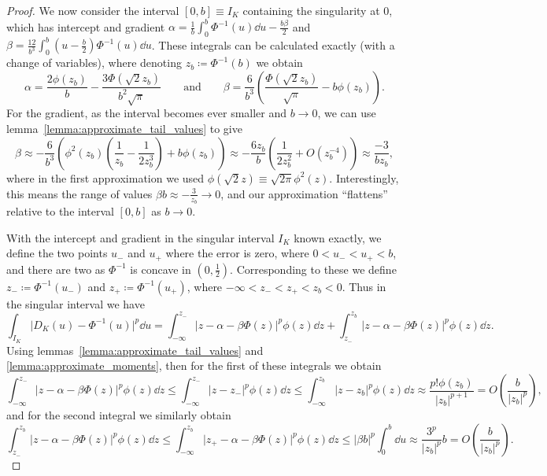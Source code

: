 \documentclass[9pt,a4paper,english]{extarticle}
\begin{document}
\begin{proof}
We now consider the interval $ [0, b] \equiv I_K $ containing the singularity at 0, which has intercept and gradient
$ \alpha = \tfrac{1}{b} \int_{0}^{b} \Phi^{-1}(u) \dd{u} - \tfrac{b\beta}{2}  $
and 
$ \beta  = \tfrac{12}{b^3} \int_{0}^{b} (u - \tfrac{b}{2}) \Phi^{-1}(u) \dd{u} $.
These integrals can be calculated exactly (with a change of variables), where denoting $ z_b \coloneqq \Phi^{-1}(b) $ we obtain
\begin{equation*}
\alpha = \dfrac{2\phi(z_b)}{b} - \dfrac{3\Phi(\sqrt{2}z_b)}{b^2\sqrt{\pi}}
\qquad \text{and} \qquad 
\beta  = \dfrac{6}{b^3} \left(\dfrac{\Phi(\sqrt{2} z_b)}{\sqrt{\pi}} - b\phi(z_b)\right).
\end{equation*}
For the gradient, as the interval becomes ever smaller and $ b \to 0 $, we can use lemma~\ref{lemma:approximate_tail_values} to give
\begin{equation*}
\beta  
\approx -\dfrac{6}{b^3} \left(\phi^2(z_b)\left(\dfrac{1}{z_b} - \dfrac{1}{2 z_b^3}\right) + b \phi(z_b)\right)
\approx -\dfrac{6z_b}{b}\left(\dfrac{1}{2z_b^2} + O(z_b^{-4})\right)
\approx \dfrac{-3}{bz_b},
\end{equation*}
where in the first approximation we used  $ \phi(\sqrt{2}z) \equiv \sqrt{2\pi}\phi^2(z) $. Interestingly, this means the range of values $ \beta b \approx -\tfrac{3}{z_b} \to 0 $, and our approximation ``flattens'' relative to the interval $ [0, b] $ as $ b \to 0 $.

With the intercept and gradient in the singular interval $ I_K $ known exactly, we define the two points $ u_- $ and $ u_+ $ where the error is zero, where $ 0 < u_- < u_+ < b $, and there are two as $ \Phi^{-1} $ is concave in $ (0, \tfrac{1}{2}) $. Corresponding to these we define $ z_- \coloneqq \Phi^{-1}(u_-) $ and $ z_+ \coloneqq \Phi^{-1}(u_+) $, where $ -\infty < z_- < z_+ < z_b < 0 $. Thus in the singular interval we have
\begin{equation*}
\int_{I_K} \lvert D_K(u) - \Phi^{-1}(u)\rvert^p \dd{u} 
= \int_{-\infty}^{z_-} \lvert z - \alpha - \beta \Phi(z)\rvert^p \phi(z) \dd{z} + \int_{z_-}^{z_b} \lvert z - \alpha - \beta \Phi(z)\rvert^p \phi(z) \dd{z}.
\end{equation*}
Using lemmas~\ref{lemma:approximate_tail_values} and \ref{lemma:approximate_moments}, then for the first of these integrals we obtain
\begin{equation*}
\int_{-\infty}^{z_-} \lvert z - \alpha - \beta \Phi(z)\rvert^p \phi(z) \dd{z}
\leq \int_{-\infty}^{z_-} \lvert z - z_-\rvert^p \phi(z) \dd{z}
\leq \int_{-\infty}^{z_b} \lvert z - z_b\rvert^p \phi(z) \dd{z}
\approx  \dfrac{p!\phi(z_b)}{\lvert z_b\rvert^{p+1}}
=  O\left(\dfrac{b}{\lvert z_b \rvert^p}\right),
\end{equation*}
and for the second integral we similarly obtain
\begin{equation*}
\int_{z_-}^{z_b} \lvert z - \alpha - \beta \Phi(z)\rvert^p \phi(z) \dd{z}
\leq \int_{-\infty}^{z_b} \lvert z_+ - \alpha - \beta \Phi(z)\rvert^p \phi(z) \dd{z}
\leq \lvert \beta b \rvert^p \int_{0}^{b}\dd{u}
\approx \dfrac{3^p}{\lvert z_b\rvert^p} b
=  O\left(\dfrac{b}{\lvert z_b \rvert^p}\right).
\end{equation*}


\end{proof}
\end{document}
